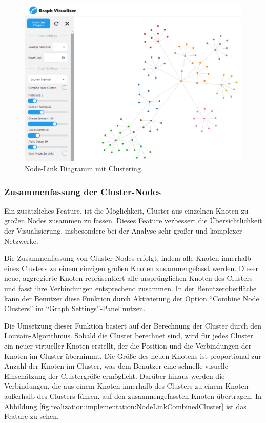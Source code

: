 \begin{figure}[h]
    \centering
    \includegraphics[height=.5\textwidth]{images/03/ClusteringView.png}
    \caption{Node-Link Diagramm mit Clustering.}
    \label{fig:realization:implementation:NodeLinkCluster}
\end{figure}

\subsubsection{Zusammenfassung der Cluster-Nodes}

Ein zusätzliches Feature, ist die Möglichkeit, Cluster aus einzelnen Knoten zu großen Nodes zusammen zu fassen. Dieses Feature verbessert die Übersichtlichkeit der Visualisierung, insbesondere bei der Analyse sehr großer und komplexer Netzwerke.

Die Zusammenfassung von Cluster-Nodes erfolgt, indem alle Knoten innerhalb eines Clusters zu einem einzigen großen Knoten zusammengefasst werden. Dieser neue, aggregierte Knoten repräsentiert alle ursprünglichen Knoten des Clusters und fasst ihre Verbindungen entsprechend zusammen. In der Benutzeroberfläche kann der Benutzer diese Funktion durch Aktivierung der Option \enquote{Combine Node Clusters} im \enquote{Graph Settings}-Panel nutzen.

Die Umsetzung dieser Funktion basiert auf der Berechnung der Cluster durch den Louvain-Algorithmus. Sobald die Cluster berechnet sind, wird für jedes Cluster ein neuer virtueller Knoten erstellt, der die Position und die Verbindungen der Knoten im Cluster übernimmt. Die Größe des neuen Knotens ist proportional zur Anzahl der Knoten im Cluster, was dem Benutzer eine schnelle visuelle Einschätzung der Clustergröße ermöglicht. Darüber hinaus werden die Verbindungen, die aus einem Knoten innerhalb des Clusters zu einem Knoten außerhalb des Clusters führen, auf den zusammengefassten Knoten übertragen. In Abbildung \ref{fig:realization:implementation:NodeLinkCombinedCluster} ist das Feature zu sehen.

